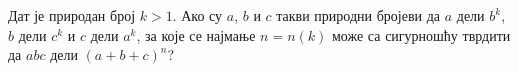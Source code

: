 Дат је природан број $k > 1$.
Ако су $a$, $b$ и $c$ такви природни бројеви да $a$ дели $b^k$, $b$ дели $c^k$
и $c$ дели $a^k$, за које се најмање $n = n(k)$ може са сигурношћу тврдити да
$a b c$ дели $(a + b + c)^n$?

\solution

